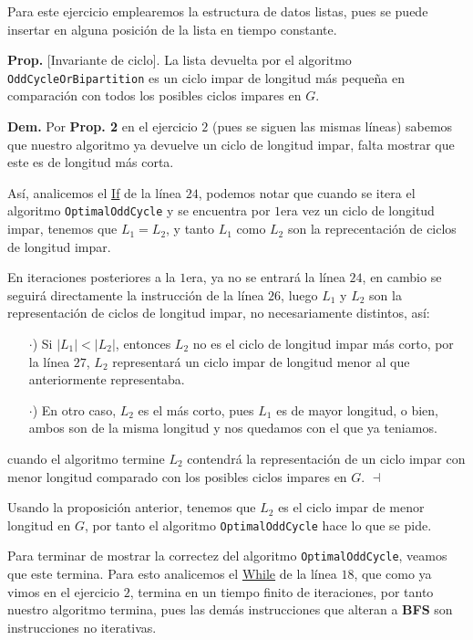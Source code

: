 \documentclass{article}
\newcommand{\code}[1]{\textcolor{white!25!black}{\texttt{#1}}}
\begin{document}
Para este ejercicio emplearemos la estructura de datos listas, pues se puede insertar
en alguna posici\'on de la lista en tiempo constante.

\textbf{Prop.} [Invariante de ciclo]. La lista devuelta por el algoritmo
\code{OddCycleOrBipartition} es un ciclo impar de longitud m\'as pequeña
en comparaci\'on con todos los posibles ciclos impares en $G$.

\textbf{Dem.} Por \textbf{Prop. 2} en el ejercicio $2$ (pues se siguen las
mismas l\'ineas) sabemos que nuestro algoritmo ya devuelve un ciclo de
longitud impar, falta mostrar que este es de longitud m\'as corta.

As\'i, analicemos el \underline{If} de la l\'inea $24$, podemos notar que
cuando se itera el algoritmo \code{OptimalOddCycle} y se encuentra por $1$era
vez un ciclo de longitud impar, tenemos que $L_1 = L_2$, y tanto $L_1$ como
$L_2$ son la reprecentaci\'on de ciclos de longitud impar.

En iteraciones posteriores a la $1$era, ya no se entrar\'a  la l\'inea $24$,
en cambio se seguir\'a directamente la instrucci\'on de la l\'inea $26$, luego
$L_1$ y $L_2$ son la representaci\'on de ciclos de longitud impar, no necesariamente
distintos, as\'i:
\begin{itemize}
\item[$\cdot$)] Si $|L_1|<|L_2|$, entonces $L_2$ no es el ciclo de longitud impar
  m\'as corto, por la l\'inea $27$, $L_2$ representar\'a un ciclo impar de longitud
  menor al que anteriormente representaba.
\item[$\cdot$)] En otro caso, $L_2$ es el m\'as corto, pues $L_1$ es de mayor
  longitud, o bien, ambos son de la misma longitud y nos quedamos con el que
  ya teniamos.
\end{itemize}
cuando el algoritmo termine $L_2$ contendr\'a la representaci\'on de un ciclo impar
con menor longitud comparado con los posibles ciclos impares en $G$.
\hfill $\dashv$

Usando la proposici\'on anterior, tenemos que $L_2$ es el ciclo impar de menor longitud en
$G$, por tanto el algoritmo \code{OptimalOddCycle} hace lo que se pide.

Para terminar de mostrar la correctez del algoritmo \code{OptimalOddCycle}, veamos que
este termina. Para esto analicemos el \underline{While} de la l\'inea $18$, que como ya
vimos en el ejercicio $2$, termina en un tiempo finito de iteraciones, por tanto
nuestro algoritmo termina, pues las dem\'as instrucciones que alteran a \textbf{BFS}
son instrucciones no iterativas.
\end{document}
